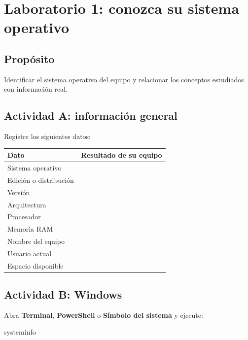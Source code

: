 \documentclass[
  spanish,
  letterpaper,
]{scrbook}
\newenvironment{Shaded}{\begin{snugshade}}{\end{snugshade}}
\newcommand{\NormalTok}[1]{\textcolor[rgb]{0.00,0.23,0.31}{#1}}
\newcounter{none} %
\begin{document}

\chapter{Laboratorio 1: conozca su sistema
operativo}\label{laboratorio-1-conozca-su-sistema-operativo}

\section{Propósito}\label{propuxf3sito}

Identificar el sistema operativo del equipo y relacionar los conceptos
estudiados con información real.

\section{Actividad A: información
general}\label{actividad-a-informaciuxf3n-general}

Registre los siguientes datos:

{\def\LTcaptype{none} %
\begin{longtable}[]{@{}ll@{}}
\toprule\noalign{}
Dato & Resultado de su equipo \\
\midrule\noalign{}
\endhead
\bottomrule\noalign{}
\endlastfoot
Sistema operativo & \\
Edición o distribución & \\
Versión & \\
Arquitectura & \\
Procesador & \\
Memoria RAM & \\
Nombre del equipo & \\
Usuario actual & \\
Espacio disponible & \\
\end{longtable}
}

\section{Actividad B: Windows}\label{actividad-b-windows}

Abra \textbf{Terminal}, \textbf{PowerShell} o \textbf{Símbolo del
sistema} y ejecute:

\begin{Shaded}
\begin{Highlighting}[]
\NormalTok{systeminfo}
\end{Highlighting}
\end{Shaded}
\end{document}
